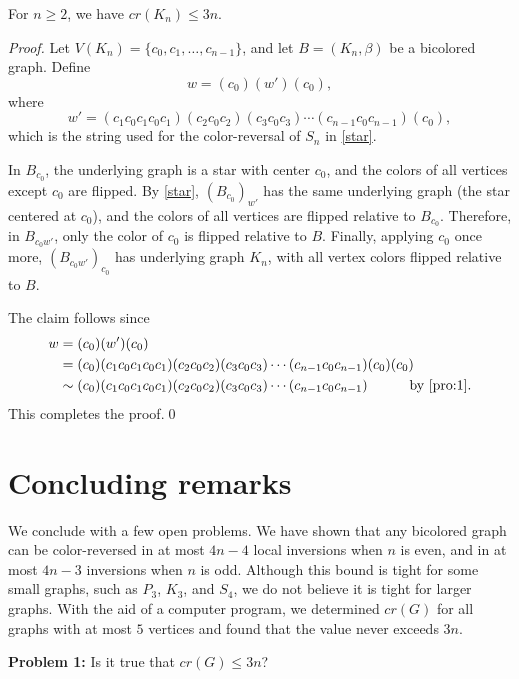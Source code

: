 \documentclass[runningheads,orivec]{llncs}
\begin{document}
\begin{theorem}\label{complete}
    For $n \geq 2$, we have $cr(K_n) \leq 3n$.
\end{theorem}
\begin{proof}
    Let $V(K_n) = \{c_0, c_1, \ldots, c_{n-1}\}$, and let $B = (K_n, \beta)$
    be a bicolored graph. Define
    \[
        w = (c_0)(w')(c_0),
    \]
    where
    \[
        w' = (c_1c_0c_1c_0c_1)(c_2c_0c_2)(c_3c_0c_3)\cdots(c_{n-1}c_0c_{n-1})(c_0),
    \]
    which is the string used for the color-reversal of $S_n$ in \autoref{star}. 

    In $B_{c_0}$, the underlying graph is a star with center $c_0$, and the colors of all vertices except $c_0$ are flipped.  
    By \autoref{star}, $(B_{c_0})_{w'}$ has the same underlying graph (the star centered at $c_0$), and the colors of all vertices are flipped relative to $B_{c_0}$.  
    Therefore, in $B_{c_0w'}$, only the color of $c_0$ is flipped relative to $B$.  
    Finally, applying $c_0$ once more, $(B_{c_0w'})_{c_0}$ has underlying graph $K_n$, with all vertex colors flipped relative to $B$.  

    The claim follows since
    \begin{align*}
        w &= (c_0)(w')(c_0) \\
          &= (c_0)(c_1c_0c_1c_0c_1)(c_2c_0c_2)(c_3c_0c_3)\cdots(c_{n-1}c_0c_{n-1})(c_0)(c_0) \\
          &\sim (c_0)(c_1c_0c_1c_0c_1)(c_2c_0c_2)(c_3c_0c_3)\cdots(c_{n-1}c_0c_{n-1})
          \hspace{30 pt} \text{by \autoref{pro:1}}.
    \end{align*}
    This completes the proof.\qed
\end{proof}

\section{Concluding remarks}\label{sec:conclusion}
We conclude with a few open problems.
We have shown that any bicolored graph can be color-reversed in at most $4n-4$ local inversions when $n$ is even, and in at most $4n-3$ inversions when $n$ is odd. Although this bound is tight for some small graphs, such as $P_3$, $K_3$, and $S_4$, we do not believe it is tight for larger graphs. With the aid of a computer program, we determined $cr(G)$ for all graphs with at most $5$ vertices and found that the value never exceeds $3n$. 

\noindent
\textbf{Problem 1:} Is it true that $cr(G)\leq 3n$?
\end{document}
